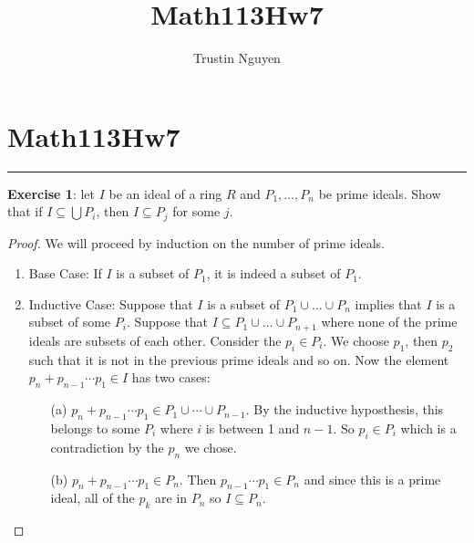 \documentclass{article}
\title{Math113Hw7}
\author{Trustin Nguyen}
\begin{document}
\maketitle

\section*{Math113Hw7}
\hrule

\textbf{Exercise 1}: let $I$ be an ideal of a ring $R$ and $P_{1}, \ldots, P_{n}$ be prime ideals. Show that if $I \subseteq \bigcup P_{i}$, then $I \subseteq P_{j}$ for some $j$.

\begin{proof}
	We will proceed by induction on the number of prime ideals. 
	\begin{enumerate}
		\item Base Case: If $I$ is a subset of $P_{1}$, it is indeed a subset of $P_{1}$.

		\item Inductive Case: Suppose that $I$ is a subset of $P_{1} \cup \ldots \cup P_{n}$ implies that $I$ is a subset of some $P_{i}$. Suppose that $I \subseteq P_{1} \cup \ldots \cup P_{n + 1}$ where none of the prime ideals are subsets of each other. Consider the $p_{i} \in P_{i}$. We choose $p_{1}$, then $p_{2}$ such that it is not in the previous prime ideals and so on. Now the element $p_{n} + p_{n - 1}\cdots p_{1} \in I$ has two cases:
		\begin{enumerate}
			\item [(a)] $p_{n} + p_{n - 1}\cdots p_{1} \in P_{1} \cup \cdots \cup P_{n - 1}$. By the inductive hyposthesis, this belongs to some $P_{i}$ where $i$ is between 1 and $n - 1$. So $p_{i} \in P_{i}$ which is a contradiction by the $p_{n}$ we chose.

			\item [(b)] $p_{n} + p_{n - 1} \cdots p_{1} \in P_{n}$. Then $p_{n - 1} \cdots p_{1} \in P_{n}$ and since this is a prime ideal, all of the $p_{k}$ are in $P_{n}$ so $I \subseteq P_{n}$.
		\end{enumerate}	
	\end{enumerate}
\end{proof}
\end{document}
